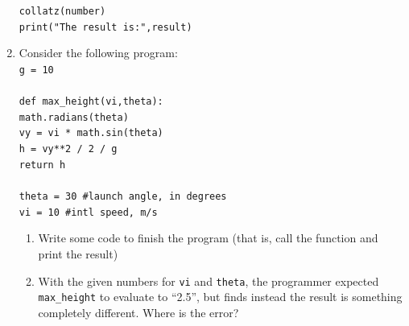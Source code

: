 \documentclass{article}
\begin{document}
\begin{enumerate}
	\texttt{collatz(number)}\\
	\texttt{print("The result is:",result)}\\
	\item Consider the following program:\\
	\texttt{g = 10}\\
	\texttt{}\\
	\texttt{def max\_height(vi,theta):}\\
	\null\quad\quad\texttt{math.radians(theta)}\\
	\null\quad\quad\texttt{vy = vi * math.sin(theta)}\\
	\null\quad\quad\texttt{h = vy**2 / 2 / g}\\
	\null\quad\quad\texttt{return h}\\
	\texttt{}\\
	\texttt{theta = 30 \#launch angle, in degrees}\\
	\texttt{vi = 10 \#intl speed, m/s}\\
	\begin{enumerate}
		\item Write some code to finish the program (that is, call the function and print the result)
		\vspace{2cm}
		\item With the given numbers for \texttt{vi} and \texttt{theta}, the programmer expected \texttt{max\_height} to evaluate to ``2.5'', but finds instead the result is something completely different. Where is the error?
	\end{enumerate}
\end{enumerate}
\end{document}
